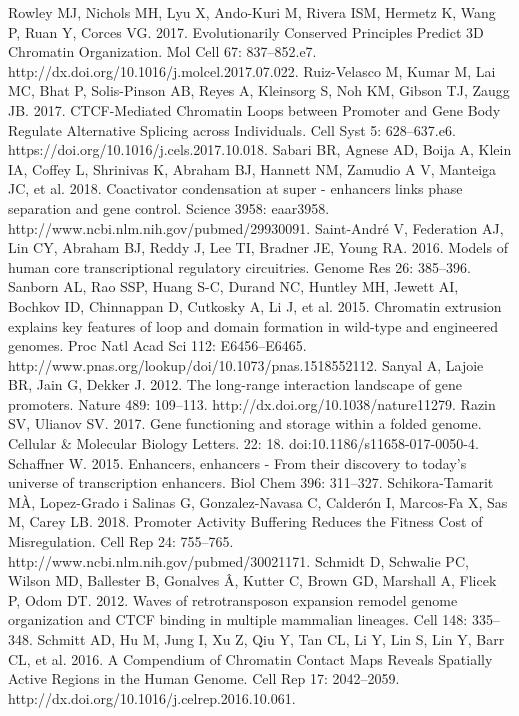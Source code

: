 \begin{thebibliography}{1}
	 Rowley MJ, Nichols MH, Lyu X, Ando-Kuri M, Rivera ISM, Hermetz K, Wang P, Ruan Y, Corces VG. 2017. Evolutionarily Conserved Principles Predict 3D Chromatin Organization. Mol Cell 67: 837–852.e7. http://dx.doi.org/10.1016/j.molcel.2017.07.022.
	 Ruiz-Velasco M, Kumar M, Lai MC, Bhat P, Solis-Pinson AB, Reyes A, Kleinsorg S, Noh KM, Gibson TJ, Zaugg JB. 2017. CTCF-Mediated Chromatin Loops between Promoter and Gene Body Regulate Alternative Splicing across Individuals. Cell Syst 5: 628–637.e6. https://doi.org/10.1016/j.cels.2017.10.018.
	 Sabari BR, Agnese AD, Boija A, Klein IA, Coffey L, Shrinivas K, Abraham BJ, Hannett NM, Zamudio A V, Manteiga JC, et al. 2018. Coactivator condensation at super - enhancers links phase separation and gene control. Science 3958: eaar3958. http://www.ncbi.nlm.nih.gov/pubmed/29930091.
	 Saint-André V, Federation AJ, Lin CY, Abraham BJ, Reddy J, Lee TI, Bradner JE, Young RA. 2016. Models of human core transcriptional regulatory circuitries. Genome Res 26: 385–396.
	 Sanborn AL, Rao SSP, Huang S-C, Durand NC, Huntley MH, Jewett AI, Bochkov ID, Chinnappan D, Cutkosky A, Li J, et al. 2015. Chromatin extrusion explains key features of loop and domain formation in wild-type and engineered genomes. Proc Natl Acad Sci 112: E6456–E6465. http://www.pnas.org/lookup/doi/10.1073/pnas.1518552112.
	 Sanyal A, Lajoie BR, Jain G, Dekker J. 2012. The long-range interaction landscape of gene promoters. Nature 489: 109–113. http://dx.doi.org/10.1038/nature11279.
	 Razin SV, Ulianov SV. 2017. Gene functioning and storage within a folded genome. Cellular \& Molecular Biology Letters. 22: 18. doi:10.1186/s11658-017-0050-4.
	 Schaffner W. 2015. Enhancers, enhancers - From their discovery to today’s universe of transcription enhancers. Biol Chem 396: 311–327.
	 Schikora-Tamarit MÀ, Lopez-Grado i Salinas G, Gonzalez-Navasa C, Calderón I, Marcos-Fa X, Sas M, Carey LB. 2018. Promoter Activity Buffering Reduces the Fitness Cost of Misregulation. Cell Rep 24: 755–765. http://www.ncbi.nlm.nih.gov/pubmed/30021171.
	 Schmidt D, Schwalie PC, Wilson MD, Ballester B, Gonalves Â, Kutter C, Brown GD, Marshall A, Flicek P, Odom DT. 2012. Waves of retrotransposon expansion remodel genome organization and CTCF binding in multiple mammalian lineages. Cell 148: 335–348.
	 Schmitt AD, Hu M, Jung I, Xu Z, Qiu Y, Tan CL, Li Y, Lin S, Lin Y, Barr CL, et al. 2016. A Compendium of Chromatin Contact Maps Reveals Spatially Active Regions in the Human Genome. Cell Rep 17: 2042–2059. http://dx.doi.org/10.1016/j.celrep.2016.10.061.

\end{thebibliography}
